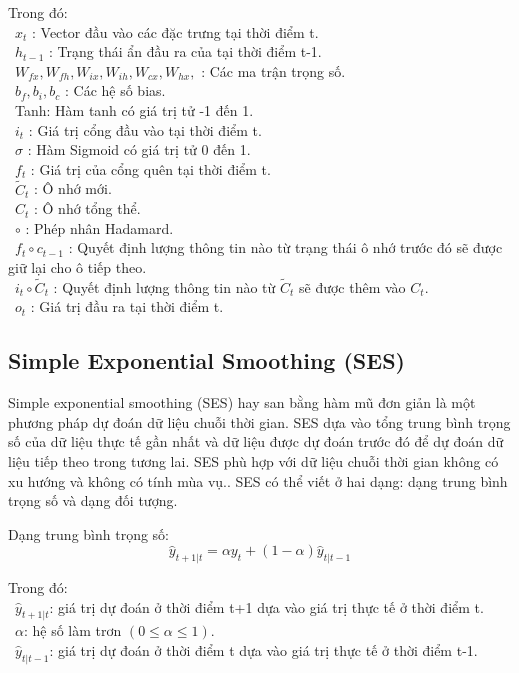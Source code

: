 \documentclass[conference]{IEEEtran}
\begin{document}
Trong đó:\\
\indent\textbullet\ \(x_t\) : Vector đầu vào các đặc trưng tại thời điểm t.\\
\indent\textbullet\ \(h_{t-1}\) : Trạng thái ẩn đầu ra của tại thời điểm t-1.\\
\indent\textbullet\ \(W_{fx},W_{fh},W_{ix},W_{ih},W_{cx},W_{hx},\) : Các ma trận trọng số.\\
\indent\textbullet\ \(b_f,b_i, b_c \) : Các hệ số bias.\\
\indent\textbullet\ Tanh: Hàm tanh có giá trị tử -1 đến 1.\\
\indent\textbullet\ \(i_t\) : Giá trị cổng đầu vào tại thời điểm t.\\
\indent\textbullet\ \(\sigma\) : Hàm Sigmoid có giá trị tử 0 đến 1.\\
\indent\textbullet\ \(f_t\) : Giá trị của cổng quên tại thời điểm t.\\
\indent\textbullet\ \(\widetilde{C}_t \) : Ô nhớ mới.\\
\indent\textbullet\ \(C_t \) : Ô nhớ tổng thể.\\
\indent\textbullet\ \(\circ\) : Phép nhân Hadamard.\\
\indent\textbullet\ \(f_t\circ c_{t-1}\) : Quyết định lượng thông tin nào từ trạng thái ô nhớ trước đó sẽ được giữ lại cho ô tiếp theo.\\
\indent\textbullet\ \(i_t\circ{\widetilde{C}}_t\) : Quyết định lượng thông tin nào từ \({\widetilde{C}}_t\) sẽ được thêm vào \(C_t\).\\
\indent\textbullet\ \(o_t \) : Giá trị đầu ra tại thời điểm t.

\subsection{Simple Exponential Smoothing (SES)}
Simple exponential smoothing (SES) hay san bằng hàm mũ đơn giản là một phương pháp dự đoán dữ liệu chuỗi thời gian. SES dựa vào tổng trung bình trọng số của dữ liệu thực tế gần nhất và dữ liệu được dự đoán trước đó để dự đoán dữ liệu tiếp theo trong tương lai. SES phù hợp với dữ liệu chuỗi thời gian không có xu hướng và không có tính mùa vụ.. SES có thể viết ở hai dạng: dạng trung bình trọng số và dạng đối tượng.

Dạng trung bình trọng số:
\[\hat{y}_{t+1|t} = \alpha y_t + (1-\alpha)\hat{y}_{t|t-1}\]

Trong đó:\\
\indent\textbullet\ \(\hat{y}_{t+1|t} \): giá trị dự đoán ở thời điểm t+1 dựa vào giá trị thực tế ở thời điểm t.\\
\indent\textbullet\ \(\alpha\): hệ số làm trơn \((0\le\alpha\le1)\).\\
\indent\textbullet\ \(\hat{y}_{t|t-1} \): giá trị dự đoán ở thời điểm t dựa vào giá trị thực tế ở thời điểm  t-1.\\
\end{document}
